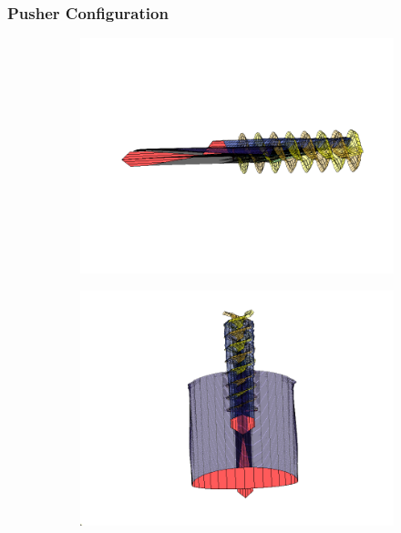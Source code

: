 \subsubsection{Pusher Configuration}
\begin{figure}[H]
    \centering
    \begin{subfigure}[b]{0.467\textwidth}
      \centering
        \includegraphics[width=\textwidth]{05_Results/Figs/VAP/fullyDevelopedWake.png}
        \caption{}
        \label{fig:TractorCofigurationWake}
         \end{subfigure}
          \begin{subfigure}[b]{0.467\textwidth}
      \centering
        \includegraphics[width=\textwidth]{05_Results/Figs/VAP/fullyDevelopedWake2.png}
        \caption{}
        \label{fig:TractorCofigurationWake2}
         \end{subfigure}
\end{figure}


